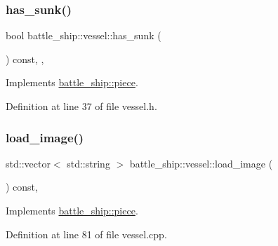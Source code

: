 \mbox{\label{classbattle__ship_1_1vessel_a5f36d687fbb87ced436d2d88847a1d5c}} 
\subsubsection{\texorpdfstring{has\+\_\+sunk()}{has\_sunk()}}
{\footnotesize\ttfamily bool battle\+\_\+ship\+::vessel\+::has\+\_\+sunk (\begin{DoxyParamCaption}{ }\end{DoxyParamCaption}) const\hspace{0.3cm}{\ttfamily [inline]}, {\ttfamily [override]}, {\ttfamily [virtual]}}



Implements \hyperlink{classbattle__ship_1_1piece_af22bd781f4206decd0beed89b014d1cc}{battle\+\_\+ship\+::piece}.



Definition at line 37 of file vessel.\+h.

\mbox{\label{classbattle__ship_1_1vessel_a36278b899be319a57cb728e8ecd2f340}} 
\subsubsection{\texorpdfstring{load\+\_\+image()}{load\_image()}}
{\footnotesize\ttfamily std\+::vector$<$ std\+::string $>$ battle\+\_\+ship\+::vessel\+::load\+\_\+image (\begin{DoxyParamCaption}{ }\end{DoxyParamCaption}) const\hspace{0.3cm}{\ttfamily [override]}, {\ttfamily [virtual]}}



Implements \hyperlink{classbattle__ship_1_1piece_aad848540970833ae5eadd115cc531b6b}{battle\+\_\+ship\+::piece}.



Definition at line 81 of file vessel.\+cpp.

\mbox{\label{classbattle__ship_1_1vessel_ace0ec527147243b1fa6fa920d5a32a1f}} 
